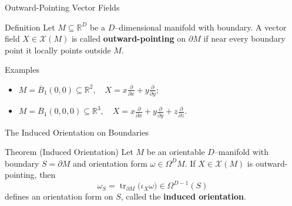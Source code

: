 \begin{frame}{Outward-Pointing Vector Fields}
\begin{block}{Definition}
Let \(M\subseteq\mathbb{R}^D\) be a $D$–dimensional manifold with boundary.
A vector field \(X\in\mathcal{X}(M)\) is called \textbf{outward-pointing} on $\partial M$
if near every boundary point it locally points outside $M$.
\end{block}

\begin{block}{Examples}
\begin{itemize}
\item \(M=\overline{B}_1(0,0)\subseteq\mathbb{R}^2,\quad X=x\frac{\partial}{\partial x}+y\frac{\partial}{\partial y}\);
\item \(M=\overline{B}_1(0,0,0)\subseteq\mathbb{R}^3,\quad X=x\frac{\partial}{\partial x}+y\frac{\partial}{\partial y}+z\frac{\partial}{\partial z}\).
\end{itemize}
\end{block}

\begin{center}
\end{center}
\end{frame}


\begin{frame}{The Induced Orientation on Boundaries}
\begin{block}{Theorem (Induced Orientation)}
Let \(M\) be an orientable $D$–manifold with boundary \(S=\partial M\)
and orientation form \(\omega\in\Omega^D M\).
If \(X\in\mathcal{X}(M)\) is outward-pointing, then
\[
\omega_S = \operatorname{tr}_{\partial M}\!\bigl(\iota_X\omega\bigr)\in\Omega^{D-1}(S)
\]
defines an orientation form on \(S\), called the \textbf{induced orientation}.
\end{block}

\end{frame}

